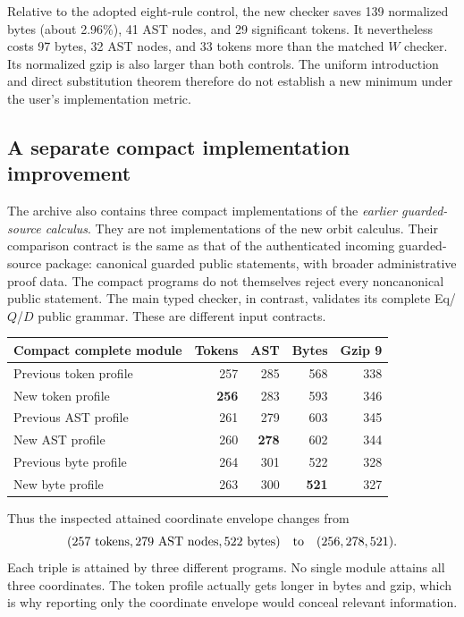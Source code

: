 Relative to the adopted eight-rule control, the new checker saves
139 normalized bytes (about 2.96\%), 41 AST nodes, and 29 significant
tokens. It nevertheless costs 97 bytes, 32 AST nodes, and 33 tokens more
than the matched $W$ checker. Its normalized gzip is also larger than
both controls. The uniform introduction and direct substitution theorem
therefore do not establish a new minimum under the user's implementation
metric.

\subsection{A separate compact implementation improvement}

The archive also contains three compact implementations of the
\emph{earlier guarded-source calculus}. They are not implementations of
the new orbit calculus. Their comparison contract is the same as that of
the authenticated incoming guarded-source package: canonical guarded
public statements, with broader administrative proof data. The compact
programs do not themselves reject every noncanonical public statement.
The main typed checker, in contrast, validates its complete Eq/$Q$/$D$
public grammar. These are different input contracts.

\begin{center}
\small
\begin{tabular}{@{}lrrrr@{}}
\toprule
Compact complete module & Tokens & AST & Bytes & Gzip 9 \\
\midrule
Previous token profile & 257 & 285 & 568 & 338 \\
New token profile & \textbf{256} & 283 & 593 & 346 \\
Previous AST profile & 261 & 279 & 603 & 345 \\
New AST profile & 260 & \textbf{278} & 602 & 344 \\
Previous byte profile & 264 & 301 & 522 & 328 \\
New byte profile & 263 & 300 & \textbf{521} & 327 \\
\bottomrule
\end{tabular}
\end{center}

Thus the inspected attained coordinate envelope changes from
\[
 (257\text{ tokens},279\text{ AST nodes},522\text{ bytes})
 \quad\hbox{to}\quad
 (256,278,521).
\]
Each triple is attained by three different programs. No single module
attains all three coordinates. The token profile actually gets longer
in bytes and gzip, which is why reporting only the coordinate envelope
would conceal relevant information.

